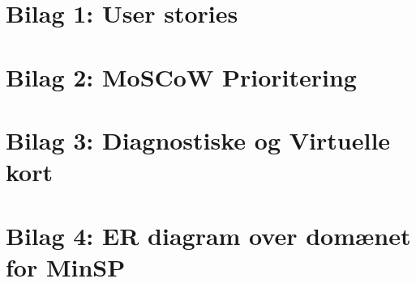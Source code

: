 \section{Bilag 1: User stories}

\newpage
\section{Bilag 2: MoSCoW Prioritering}

\section{Bilag 3: Diagnostiske og Virtuelle kort}

\section{Bilag 4: ER diagram over domænet for MinSP}

